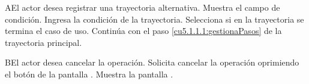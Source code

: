  \begin{UCtrayectoriaA}{A}{El actor desea registrar una trayectoria alternativa.}
    \UCpaso[\UCsist] Muestra el campo de condición.
    \UCpaso[\UCactor] Ingresa la condición de la trayectoria.
    \UCpaso[\UCactor] Selecciona si en la trayectoria se termina el caso de uso.
    \UCpaso[] Continúa con el paso \ref{cu5.1.1.1:gestionaPasos} de la trayectoria principal.
 \end{UCtrayectoriaA}
 \begin{UCtrayectoriaA}{B}{El actor desea cancelar la operación.}
    \UCpaso[\UCactor] Solicita cancelar la operación oprimiendo el botón  de la pantalla .
    \UCpaso[\UCsist] Muestra la pantalla .
 \end{UCtrayectoriaA}
 
